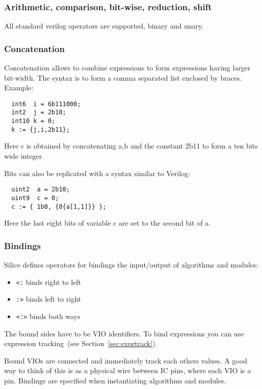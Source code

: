 \documentclass[a4]{article}
\newcommand\todo[1]{{\color{magenta}\textbf{TODO:} #1}}
\newcommand\silice{Silice}
\begin{document}
\subsubsection{Arithmetic, comparison, bit-wise, reduction, shift}

All standard verilog operators are supported, binary and unary.

\subsubsection{Concatenation}

Concatenation allows to combine expressions to form expressions having larger bit-width.
The syntax is to form a comma separated list enclosed by braces.  Example:
\begin{verbatim}
  int6  i = 6b111000;
  int2  j = 2b10;
  int10 k = 0;
  k := {j,i,2b11};
\end{verbatim}

Here c is obtained by concatenating a,b and the constant 2b11 to form a ten bits wide integer.

Bits can also be replicated with a syntax similar to Verilog:

\begin{verbatim}
  uint2  a = 2b10;
  uint9  c = 0;
  c := { 1b0, {8{a[1,1]}} };
\end{verbatim}

Here the last eight bits of variable c are set to the second bit of a.

\subsubsection{Bindings}
\label{sec:bindings}

\silice{} defines operators for bindings the input/output of algorithms and modules:
\begin{itemize}
	\item \texttt{<:} binds right to left
	\item \texttt{:>} binds left to right
	\item \texttt{<:>} binds both ways %
\end{itemize}

The bound sides have to be VIO identifiers. To bind expressions you can use expression tracking~(see Section~\ref{sec:exprtrack}).

Bound VIOs are connected and immediately track each others values.
A good way to think of this is as a physical wire between IC pins, where each VIO is a pin.
Bindings are specified when instantiating algorithms and modules. 
\end{document}
